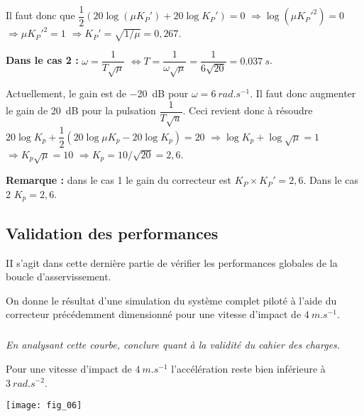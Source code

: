 \begin{multicols}{2}
\begin{multicols}{2}
\begin{corrige}
Il faut donc que $\dfrac{1}{2}\left( 20\log\left( \mu K_P'\right) + 20\log K_P'  \right)=0 $ 
$\Rightarrow \log\left( \mu K_P'^2\right)  =0$
$\Rightarrow  \mu K_P'^2 =1$
$\Rightarrow   K_P' =\sqrt{1/\mu}=0,267$.

\textbf{Dans le cas 2 :}
$\omega=\dfrac{1}{T\sqrt{\mu}}$ $ \Leftrightarrow T=\dfrac{1}{\omega\sqrt{\mu}}=\dfrac{1}{6\sqrt{20}}=\SI{0,037}{s}$.

Actuellement, le gain est de \SI{-20}{dB} pour $\omega=\SI{6}{rad.s^{-1}}$. Il faut donc augmenter le gain de \SI{20}{dB} pour la pulsation $\dfrac{1}{T\sqrt{u}}$. Ceci revient donc à résoudre 
$20\log K_p + \dfrac{1}{2}\left( 20\log \mu K_p  - 20\log K_p \right) = 20$
$\Rightarrow \log K_p +  \log \sqrt{\mu}= 1$
$\Rightarrow  K_p \sqrt{\mu}= 10$
$\Rightarrow  K_p = 10/\sqrt{20}=2,6$.

\textbf{Remarque : } dans le cas 1 le gain du correcteur est $K_P\times K_P' = 2,6$. Dans le cas 2  $K_p=2,6$. 

\end{corrige}
\else
\fi

\subsection*{Validation des performances}

\begin{obj}
II s'agit dans cette dernière partie de vérifier les performances globales de la boucle d'asservissement.
\end{obj}
\ifprof
\else
On donne le résultat d'une simulation du système complet piloté à l'aide du correcteur précédemment dimensionné pour une vitesse d'impact de $\SI{4}{m.s^{-1}}$.
\fi

\subparagraph{}\textit{En analysant cette courbe, conclure quant à la validité du cahier des charges.}
\ifprof
\begin{corrige}
Pour une vitesse d'impact de $\SI{4}{m.s^{-1}}$ l'accélération reste bien inférieure à $\SI{3}{rad.s^{-2}}$.
\end{corrige}
\else
\fi

\ifprof
\else
\begin{center}
\texttt{[image: fig\_06]}
\end{center}

\fi




\ifprof
\end{multicols}
\else
\end{multicols}
\fi

%
%
%
%
%
%
